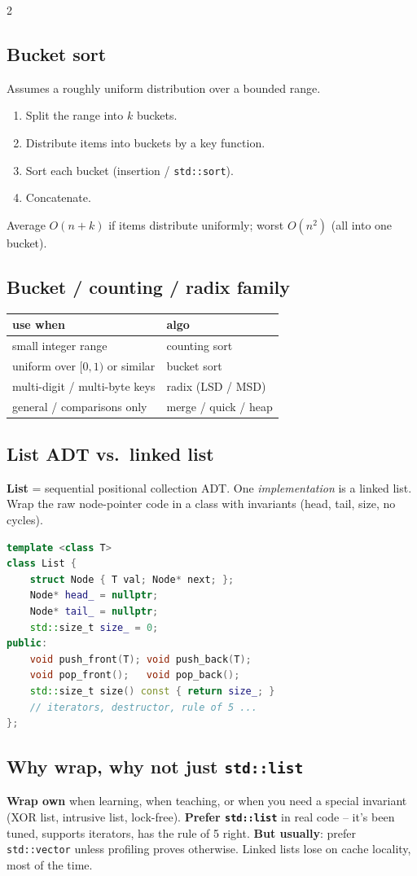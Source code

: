 \documentclass[10pt]{article}
\begin{document}
\begin{multicols}{2}
\subsection*{Bucket sort}
Assumes a roughly uniform distribution over a bounded range.
\begin{enumerate}
    \item Split the range into $k$ buckets.
    \item Distribute items into buckets by a key function.
    \item Sort each bucket (insertion / \texttt{std::sort}).
    \item Concatenate.
\end{enumerate}
Average $O(n + k)$ if items distribute uniformly;
worst $O(n^2)$ (all into one bucket).

\subsection*{Bucket / counting / radix family}
\begin{tabular}{@{}l|l@{}}
\textbf{use when} & \textbf{algo}\\
\hline
small integer range & counting sort\\
uniform over $[0,1)$ or similar & bucket sort\\
multi-digit / multi-byte keys  & radix (LSD / MSD)\\
general / comparisons only     & merge / quick / heap
\end{tabular}

\columnbreak

\subsection*{List ADT vs.\ linked list}
\textbf{List} = sequential positional collection ADT. One
\emph{implementation} is a linked list. Wrap the raw node-pointer
code in a class with invariants (head, tail, size, no cycles).

\begin{lstlisting}[language=C++]
template <class T>
class List {
    struct Node { T val; Node* next; };
    Node* head_ = nullptr;
    Node* tail_ = nullptr;
    std::size_t size_ = 0;
public:
    void push_front(T); void push_back(T);
    void pop_front();   void pop_back();
    std::size_t size() const { return size_; }
    // iterators, destructor, rule of 5 ...
};
\end{lstlisting}

\subsection*{Why wrap, why not just \texttt{std::list}}
\textbf{Wrap own} when learning, when teaching, or when you need
a special invariant (XOR list, intrusive list, lock-free).
\textbf{Prefer \texttt{std::list}} in real code -- it's been tuned,
supports iterators, has the rule of 5 right. \textbf{But usually}:
prefer \texttt{std::vector} unless profiling proves otherwise.
Linked lists lose on cache locality, most of the time.


\end{multicols}
\end{document}
